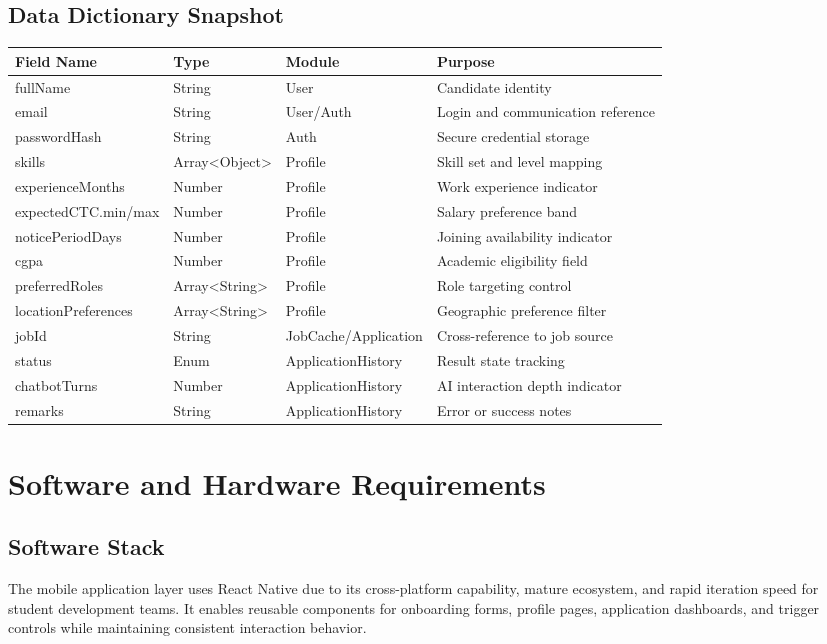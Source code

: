 \documentclass[12pt,a4paper,oneside]{report}
\begin{document}
\section{Data Dictionary Snapshot}
\begin{longtable}{p{}p{}p{}p{}}
\toprule
Field Name & Type & Module & Purpose \\
\midrule
fullName & String & User & Candidate identity \\
email & String & User/Auth & Login and communication reference \\
passwordHash & String & Auth & Secure credential storage \\
skills & Array<Object> & Profile & Skill set and level mapping \\
experienceMonths & Number & Profile & Work experience indicator \\
expectedCTC.min/max & Number & Profile & Salary preference band \\
noticePeriodDays & Number & Profile & Joining availability indicator \\
cgpa & Number & Profile & Academic eligibility field \\
preferredRoles & Array<String> & Profile & Role targeting control \\
locationPreferences & Array<String> & Profile & Geographic preference filter \\
jobId & String & JobCache/Application & Cross-reference to job source \\
status & Enum & ApplicationHistory & Result state tracking \\
chatbotTurns & Number & ApplicationHistory & AI interaction depth indicator \\
remarks & String & ApplicationHistory & Error or success notes \\
\bottomrule
\end{longtable}

\chapter{Software and Hardware Requirements}
\section{Software Stack}
The mobile application layer uses React Native due to its cross-platform capability, mature ecosystem, and rapid iteration speed for student development teams. It enables reusable components for onboarding forms, profile pages, application dashboards, and trigger controls while maintaining consistent interaction behavior.
\end{document}
